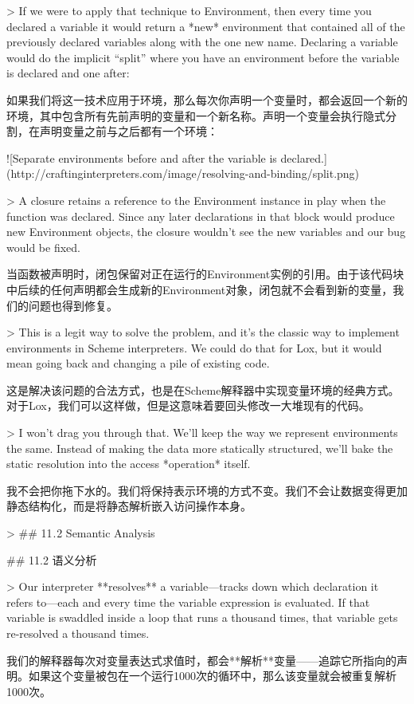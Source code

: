 \documentclass[cn,11pt,chinese]{elegantbook}
\begin{document}
{{{> If we were to apply that technique to Environment, then every time you declared a variable it would return a *new* environment that contained all of the previously declared variables along with the one new name. Declaring a variable would do the implicit “split” where you have an environment before the variable is declared and one after:

如果我们将这一技术应用于环境，那么每次你声明一个变量时，都会返回一个新的环境，其中包含所有先前声明的变量和一个新名称。声明一个变量会执行隐式分割，在声明变量之前与之后都有一个环境：

![Separate environments before and after the variable is declared.](http://craftinginterpreters.com/image/resolving-and-binding/split.png)

> A closure retains a reference to the Environment instance in play when the function was declared. Since any later declarations in that block would produce new Environment objects, the closure wouldn’t see the new variables and our bug would be fixed.

当函数被声明时，闭包保留对正在运行的Environment实例的引用。由于该代码块中后续的任何声明都会生成新的Environment对象，闭包就不会看到新的变量，我们的问题也得到修复。

> This is a legit way to solve the problem, and it’s the classic way to implement environments in Scheme interpreters. We could do that for Lox, but it would mean going back and changing a pile of existing code.

这是解决该问题的合法方式，也是在Scheme解释器中实现变量环境的经典方式。对于Lox，我们可以这样做，但是这意味着要回头修改一大堆现有的代码。

> I won’t drag you through that. We’ll keep the way we represent environments the same. Instead of making the data more statically structured, we’ll bake the static resolution into the access *operation* itself.

我不会把你拖下水的。我们将保持表示环境的方式不变。我们不会让数据变得更加静态结构化，而是将静态解析嵌入访问操作本身。

> ## 11 . 2 Semantic Analysis

## 11.2 语义分析

> Our interpreter **resolves** a variable—tracks down which declaration it refers to—each and every time the variable expression is evaluated. If that variable is swaddled inside a loop that runs a thousand times, that variable gets re-resolved a thousand times.

我们的解释器每次对变量表达式求值时，都会**解析**变量——追踪它所指向的声明。如果这个变量被包在一个运行1000次的循环中，那么该变量就会被重复解析1000次。

}}}
\end{document}

